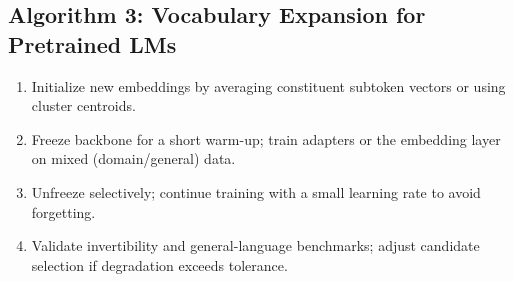 \subsection*{Algorithm 3: Vocabulary Expansion for Pretrained LMs}
\begin{enumerate}
  \item Initialize new embeddings by averaging constituent subtoken vectors or using cluster centroids.
  \item Freeze backbone for a short warm-up; train adapters or the embedding layer on mixed (domain/general) data.
  \item Unfreeze selectively; continue training with a small learning rate to avoid forgetting.
  \item Validate invertibility and general-language benchmarks; adjust candidate selection if degradation exceeds tolerance.
\end{enumerate}

